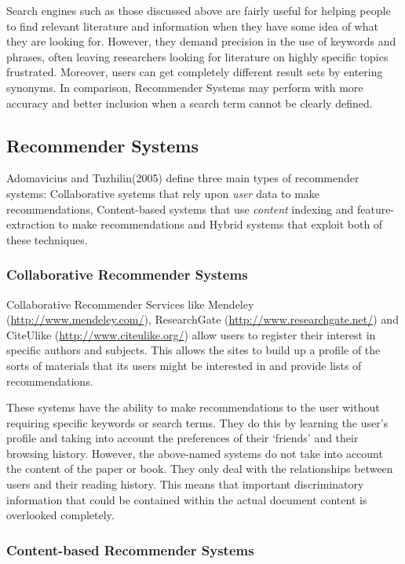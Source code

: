 Search engines such as those discussed above are fairly useful for helping
people to find relevant literature and information when they have some idea of
what they are looking for. However, they demand precision in the use of
keywords and phrases, often leaving researchers looking for literature on highly
specific topics frustrated. Moreover, users can get completely different result
sets by entering synonyms. In comparison, Recommender Systems may perform with
more accuracy and better inclusion when a search term cannot be clearly
defined.

\subsection{Recommender Systems}

Adomavicius and Tuzhilin(2005) define three main types of recommender systems:
Collaborative systems that rely upon \emph{user} data to make recommendations,
Content-based systems that use \emph{content} indexing and feature-extraction
to make recommendations and Hybrid systems that exploit both of these
techniques\cite{adomavicius2005toward}. 

\subsubsection{Collaborative Recommender Systems}

Collaborative Recommender Services like Mendeley
(\url{http://www.mendeley.com/}), ResearchGate
(\url{http://www.researchgate.net/})  and CiteUlike
(\url{http://www.citeulike.org/}) allow users to register their interest in
specific authors and subjects. This allows the sites to build up a profile of
the sorts of materials that its users might be interested in and provide lists
of recommendations.

These systems have the ability to make recommendations to the user without
requiring specific keywords or search terms. They do this by learning the
user's profile and taking into account the preferences of their `friends' and
their browsing history. However, the above-named systems do not take into
account the content of the paper or book. They only deal with the relationships
between users and their reading history. This means that important
discriminatory information that could be contained within the actual document
content is overlooked completely. 

\subsubsection{ Content-based Recommender Systems}

